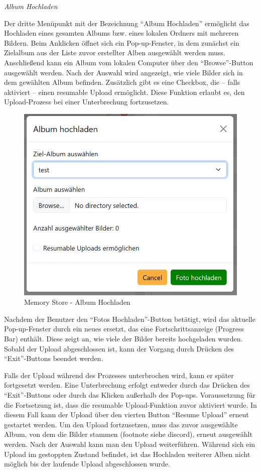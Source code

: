 {\textit{Album Hochladen}}


Der dritte Menüpunkt mit der Bezeichnung ``Album Hochladen'' ermöglicht das Hochladen eines gesamten Albums bzw. eines lokalen Ordners mit mehreren Bildern. Beim Anklicken öffnet sich ein Pop-up-Fenster, in dem zunächst ein Zielalbum aus der Liste zuvor erstellter Alben ausgewählt werden muss. Anschlie\ss{}end kann ein Album vom lokalen Computer über den ``Browse''-Button ausgewählt werden. Nach der Auswahl wird angezeigt, wie viele Bilder sich in dem gewählten Album befinden. Zusätzlich gibt es eine Checkbox, die – falls aktiviert – einen resumable Upload ermöglicht. Diese Funktion erlaubt es, den Upload-Prozess bei einer Unterbrechung fortzusetzen.

\begin{figure}
    \centering
    \includegraphics[scale=0.4]{pics/memory_store_teil1_button3.PNG}
    \caption{Memory Store - Album Hochladen}
    \label{fig:memory-store-album-hochladen}
\end{figure}

Nachdem der Benutzer den ``Fotos Hochladen''-Button betätigt, wird das aktuelle Pop-up-Fenster durch ein neues ersetzt, das eine Fortschrittsanzeige (Progress Bar) enthält. Diese zeigt an, wie viele der Bilder bereits hochgeladen wurden. Sobald der Upload abgeschlossen ist, kann der Vorgang durch Drücken des ``Exit''-Buttons beendet werden.

Falls der Upload während des Prozesses unterbrochen wird, kann er später fortgesetzt werden. Eine Unterbrechung erfolgt entweder durch das Drücken des ``Exit''-Buttons oder durch das Klicken au\ss{}erhalb des Pop-ups. Voraussetzung für die Fortsetzung ist, dass die resumable Upload-Funktion zuvor aktiviert wurde. In diesem Fall kann der Upload über den vierten Button ``Resume Upload'' erneut gestartet werden. Um den Upload fortzusetzen, muss das zuvor ausgewählte Album, von dem die Bilder stammen (footnote siehe discord), erneut ausgewählt werden. Nach der Auswahl kann man den Upload weiterführen. Während sich ein Upload im gestoppten Zustand befindet, ist das Hochladen weiterer Alben nicht möglich bis der laufende Upload abgeschlossen wurde.

